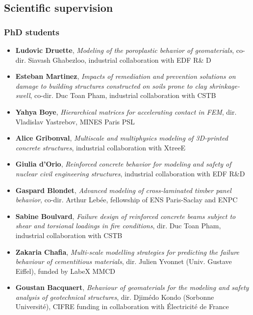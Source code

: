 \subsection*{\textcolor{navier_blue}{Scientific supervision}}

\subsubsection*{PhD students}
\begin{itemize}[noitemsep]
\item[2025-now] \textbf{Ludovic Druette}, \textit{Modeling of the poroplastic behavior of geomaterials}, co-dir. Siavash Ghabezloo, industrial collaboration with EDF R\& D
\item[2025-now] \textbf{Esteban Martinez}, \textit{Impacts of remediation and prevention solutions on damage to building structures constructed on soils prone to clay shrinkage-swell}, co-dir. Duc Toan Pham, industrial collaboration with CSTB
\item[2024-now] \textbf{Yahya Boye}, \textit{Hierarchical matrices for accelerating contact in FEM}, dir. Vladislav Yastrebov, MINES Paris PSL
\item[2023-now] \textbf{Alice Gribonval}, \textit{Multiscale and multiphysics modeling of 3D-printed concrete structures}, industrial collaboration with XtreeE
\item[2023-now] \textbf{Giulia d'Orio}, \textit{Reinforced concrete behavior for modeling and safety of nuclear civil engineering structures}, industrial collaboration with EDF R\&{}D
\item[2023-now] \textbf{Gaspard Blondet}, \textit{Advanced modeling of cross-laminated timber panel behavior}, co-dir. Arthur Lebée, fellowship of ENS Paris-Saclay and ENPC
\item[2021-2024] \textbf{Sabine Boulvard}, \textit{Failure design of reinforced concrete beams subject to shear and torsional loadings in fire conditions}, dir. Duc Toan Pham, industrial collaboration with CSTB
\item[2021-2024] \textbf{Zakaria Chafia}, \textit{Multi-scale modelling strategies for predicting the failure behaviour of cementitious materials}, dir. Julien Yvonnet (Univ. Gustave Eiffel), funded by LabeX MMCD
\item[2020-2023] \textbf{Goustan Bacquaert}, \textit{Behaviour of geomaterials for the modeling and safety analysis of geotechnical structures}, dir. Djimédo Kondo (Sorbonne Université), CIFRE funding in collaboration with \'Electricité de France

\end{itemize}
